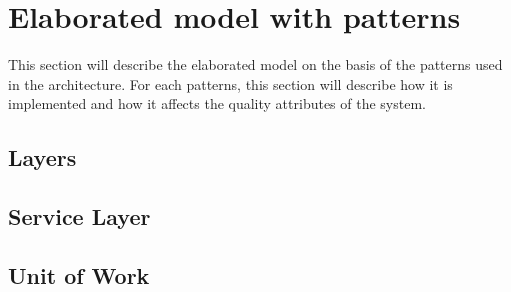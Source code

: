 
\section{Elaborated model with patterns}
This section will describe the elaborated model on the basis of the patterns used in the architecture. For each patterns, this section will describe how it is implemented and how it affects the quality attributes of the system.

\subsection{Layers}

\subsection{Service Layer}

\subsection{Unit of Work}


